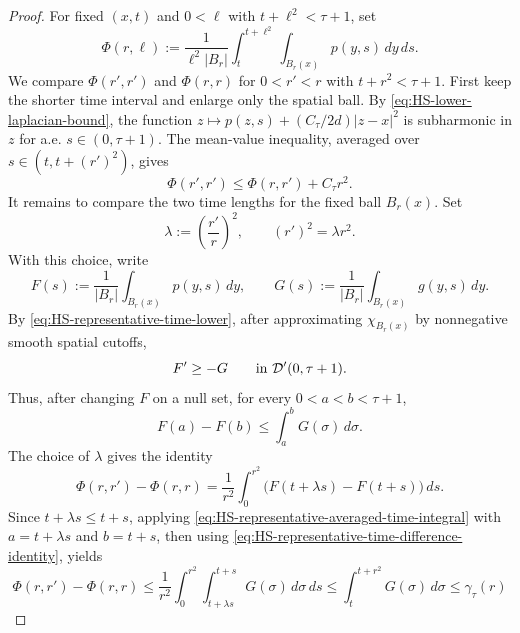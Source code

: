 \documentclass[11pt]{amsart}
\numberwithin{equation}{section}
\numberwithin{figure}{section}
\theoremstyle{plain}
\theoremstyle{definition}
\theoremstyle{remark}
\theoremstyle{plain}
\newcommand{\abs}[1]{\lvert #1 \rvert}
\begin{document}
\begin{proof}
For fixed \((x,t)\) and \(0<\ell\) with \(t+\ell^2<\tau+1\), set
\[
    \Phi(r,\ell):=
    \frac{1}{\ell^2\abs{B_r}}
    \int_t^{t+\ell^2}\int_{B_r(x)}p(y,s)\,dy\,ds .
\]
We compare \(\Phi(r',r')\) and \(\Phi(r,r)\) for \(0<r'<r\) with
\(t+r^2<\tau+1\).  First keep the shorter time interval and enlarge only
the spatial ball.  By \eqref{eq:HS-lower-laplacian-bound}, the function
\(z\mapsto p(z,s)+(C_\tau/2d)\abs{z-x}^2\) is subharmonic in \(z\) for a.e.
\(s\in(0,\tau+1)\).  The mean-value inequality, averaged over
\(s\in(t,t+(r')^2)\), gives
\begin{equation}\label{eq:HS-representative-spatial-comparison}
    \Phi(r',r')\leq \Phi(r,r')+C_\tau r^2 .
\end{equation}
It remains to compare the two time lengths for the fixed ball \(B_r(x)\).
Set
\begin{equation}\label{eq:HS-representative-lambda-def}
    \lambda:=\left(\frac{r'}{r}\right)^2,
    \qquad
    (r')^2=\lambda r^2 .
\end{equation}
With this choice, write
\[
    F(s):=\frac1{\abs{B_r}}\int_{B_r(x)}p(y,s)\,dy,
    \qquad
    G(s):=\frac1{\abs{B_r}}\int_{B_r(x)}g(y,s)\,dy .
\]
By \eqref{eq:HS-representative-time-lower}, after approximating
\(\chi_{B_r(x)}\) by nonnegative smooth spatial cutoffs,
\begin{equation}
    F'\geq -G
    \qquad\hbox{in }\mathcal D'(0,\tau+1).
\end{equation}
Thus, after changing
\(F\) on a null set, for every \(0<a<b<\tau+1\),
\begin{equation}\label{eq:HS-representative-averaged-time-integral}
    F(a)-F(b)\leq \int_a^b G(\sigma)\,d\sigma .
\end{equation}
The choice of \(\lambda\) gives the identity
\begin{equation}\label{eq:HS-representative-time-difference-identity}
    \Phi(r,r')-\Phi(r,r)
    =
    \frac1{r^2}\int_0^{r^2}\bigl(F(t+\lambda s)-F(t+s)\bigr)\,ds .
\end{equation}
Since \(t+\lambda s\leq t+s\), applying
\eqref{eq:HS-representative-averaged-time-integral} with
\(a=t+\lambda s\) and \(b=t+s\), then using
\eqref{eq:HS-representative-time-difference-identity}, yields
\begin{equation}\label{eq:HS-representative-time-comparison}
    \Phi(r,r')-\Phi(r,r)
    \leq
    \frac1{r^2}\int_0^{r^2}\int_{t+\lambda s}^{t+s}G(\sigma)\,d\sigma\,ds
    \leq \int_t^{t+r^2}G(\sigma)\,d\sigma
    \leq \gamma_{\tau}(r)
\end{equation}

\end{proof}
\end{document}
